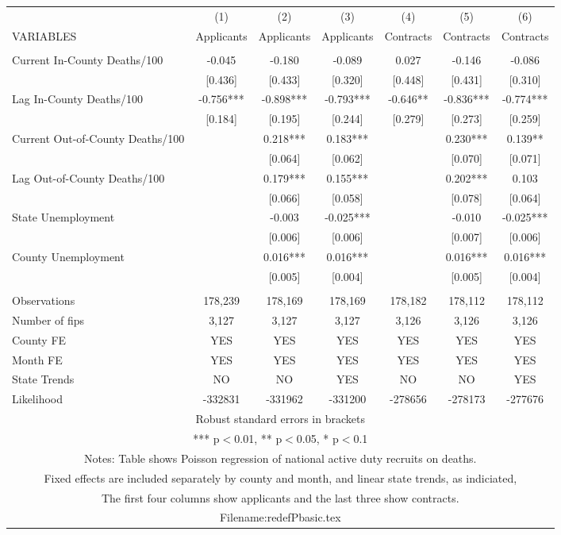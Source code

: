 \documentclass[]{article}
\begin{document}
\begin{tabular}{lcccccc} \hline
 & (1) & (2) & (3) & (4) & (5) & (6) \\
VARIABLES & Applicants & Applicants & Applicants & Contracts & Contracts & Contracts \\ \hline
 &  &  &  &  &  &  \\
Current In-County Deaths/100 & -0.045 & -0.180 & -0.089 & 0.027 & -0.146 & -0.086 \\
 & [0.436] & [0.433] & [0.320] & [0.448] & [0.431] & [0.310] \\
Lag In-County Deaths/100 & -0.756*** & -0.898*** & -0.793*** & -0.646** & -0.836*** & -0.774*** \\
 & [0.184] & [0.195] & [0.244] & [0.279] & [0.273] & [0.259] \\
Current Out-of-County Deaths/100 &  & 0.218*** & 0.183*** &  & 0.230*** & 0.139** \\
 &  & [0.064] & [0.062] &  & [0.070] & [0.071] \\
Lag Out-of-County Deaths/100 &  & 0.179*** & 0.155*** &  & 0.202*** & 0.103 \\
 &  & [0.066] & [0.058] &  & [0.078] & [0.064] \\
State Unemployment &  & -0.003 & -0.025*** &  & -0.010 & -0.025*** \\
 &  & [0.006] & [0.006] &  & [0.007] & [0.006] \\
County Unemployment &  & 0.016*** & 0.016*** &  & 0.016*** & 0.016*** \\
 &  & [0.005] & [0.004] &  & [0.005] & [0.004] \\
 &  &  &  &  &  &  \\
Observations & 178,239 & 178,169 & 178,169 & 178,182 & 178,112 & 178,112 \\
Number of fips & 3,127 & 3,127 & 3,127 & 3,126 & 3,126 & 3,126 \\
County FE & YES & YES & YES & YES & YES & YES \\
Month FE & YES & YES & YES & YES & YES & YES \\
State Trends & NO & NO & YES & NO & NO & YES \\
 Likelihood & -332831 & -331962 & -331200 & -278656 & -278173 & -277676 \\ \hline
\multicolumn{7}{c}{ Robust standard errors in brackets} \\
\multicolumn{7}{c}{ *** p$<$0.01, ** p$<$0.05, * p$<$0.1} \\
\multicolumn{7}{c}{ Notes: Table shows Poisson regression of national active duty recruits on deaths.} \\
\multicolumn{7}{c}{ Fixed effects are included separately by county and month, and linear state trends, as indiciated,} \\
\multicolumn{7}{c}{ The first four columns show applicants and the last three show contracts.} \\
\multicolumn{7}{c}{ Filename:redefPbasic.tex} \\
\end{tabular}
\end{document}
